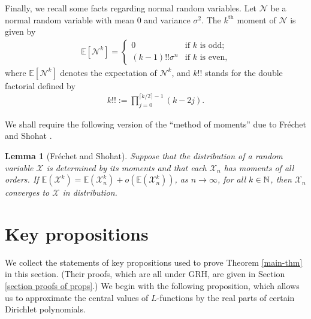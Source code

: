 \documentclass[11pt]{amsart}
\newtheorem{lemma}[prop]{Lemma}
\numberwithin{equation}{section}
\theoremstyle{remark}
\begin{document}
Finally, we recall some facts regarding normal random variables. Let $\mathcal{N}$ be a normal random variable with mean 0 and variance $\sigma^{2}$. The $k^\mathrm{th}$ moment of $\mathcal{N}$ is given by 
\begin{align*}
\mathbb{E}[\mathcal{N}^{k}]
=\begin{cases} 0&\mbox{if $k$ is odd;}\\
(k-1)!!\sigma^{n}&\mbox{if $k$ is even,}
\end{cases}
\end{align*}
where $\mathbb{E}[\mathcal{N}^{k}]$ denotes the  expectation of $\mathcal{N}^{k}$, and  $k!!$ stands for the double factorial defined by
\begin{align}\label{def-!!}
k!!:=\prod_{j=0}^{\lceil k/2\rceil -1}(k-2j).
\end{align}

We shall require the following version of the ``method of moments'' due to Fr\'echet and Shohat \cite{FS}. 

\begin{lemma}
[Fr\'echet and Shohat]\label{probability}
Suppose that the distribution of a random variable $\mathcal{X}$ is determined by its moments and that each $\mathcal{X}_{n}$ has moments of all orders. If $\mathbb{E}(\mathcal{X}^{k})=\mathbb{E}(\mathcal{X}_{n}^{k})+o(\mathbb{E}(\mathcal{X}_{n}^{k}))$, as $n\rightarrow\infty$, for all $k\in \Bbb{N}$, then $\mathcal{X}_{n}$ converges to $\mathcal{X}$ in distribution.
\end{lemma}




\section{Key propositions}
We collect the statements of key propositions used to prove Theorem \ref{main-thm} in this section. (Their proofs, which are all under GRH, are given in Section \ref{section proofs of props}.) We begin with the following proposition, which allows us to approximate the central values of $ L$-functions by the real parts of certain Dirichlet polynomials.
\end{document}
